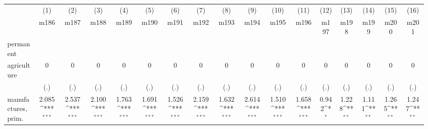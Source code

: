 {
\def\sym#1{\ifmmode^{#1}\else\(^{#1}\)\fi}
\begin{tabular}{l*{16}{c}}
\hline\hline
                    &\multicolumn{1}{c}{(1)}&\multicolumn{1}{c}{(2)}&\multicolumn{1}{c}{(3)}&\multicolumn{1}{c}{(4)}&\multicolumn{1}{c}{(5)}&\multicolumn{1}{c}{(6)}&\multicolumn{1}{c}{(7)}&\multicolumn{1}{c}{(8)}&\multicolumn{1}{c}{(9)}&\multicolumn{1}{c}{(10)}&\multicolumn{1}{c}{(11)}&\multicolumn{1}{c}{(12)}&\multicolumn{1}{c}{(13)}&\multicolumn{1}{c}{(14)}&\multicolumn{1}{c}{(15)}&\multicolumn{1}{c}{(16)}\\
                    &\multicolumn{1}{c}{m186}&\multicolumn{1}{c}{m187}&\multicolumn{1}{c}{m188}&\multicolumn{1}{c}{m189}&\multicolumn{1}{c}{m190}&\multicolumn{1}{c}{m191}&\multicolumn{1}{c}{m192}&\multicolumn{1}{c}{m193}&\multicolumn{1}{c}{m194}&\multicolumn{1}{c}{m195}&\multicolumn{1}{c}{m196}&\multicolumn{1}{c}{m197}&\multicolumn{1}{c}{m198}&\multicolumn{1}{c}{m199}&\multicolumn{1}{c}{m200}&\multicolumn{1}{c}{m201}\\
\hline
permanent           &                     &                     &                     &                     &                     &                     &                     &                     &                     &                     &                     &                     &                     &                     &                     &                     \\
agriculture         &           0         &           0         &           0         &           0         &           0         &           0         &           0         &           0         &           0         &           0         &           0         &           0         &           0         &           0         &           0         &           0         \\
                    &         (.)         &         (.)         &         (.)         &         (.)         &         (.)         &         (.)         &         (.)         &         (.)         &         (.)         &         (.)         &         (.)         &         (.)         &         (.)         &         (.)         &         (.)         &         (.)         \\
[1em]
manufactures, prim. &       2.085\sym{***}&       2.537\sym{***}&       2.100\sym{***}&       1.763\sym{***}&       1.691\sym{***}&       1.526\sym{***}&       2.159\sym{***}&       1.632\sym{***}&       2.614\sym{***}&       1.510\sym{***}&       1.658\sym{***}&       0.942\sym{*}  &       1.228\sym{**} &       1.111\sym{**} &       1.265\sym{**} &       1.247\sym{**} \\

\end{tabular}}
